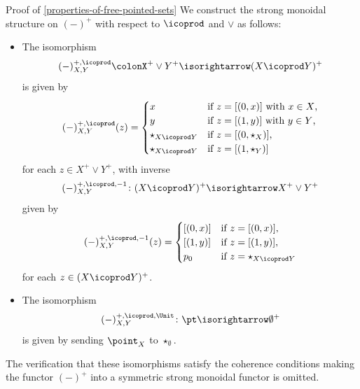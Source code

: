 \begin{Proof}{Proof of \cref{properties-of-free-pointed-sets}}
    We construct the strong monoidal structure on $(-)^{+}$ with respect to $\icoprod$ and $\vee$ as follows:
    \begin{itemize}
        \item{}The isomorphism
            \[
                (-)^{+,\icoprod}_{X,Y}%
                \colon%
                X^{+}\vee Y^{+}%
                \isorightarrow
                (X\icoprod Y)^{+}
            \]%
            is given by
            \[
                (-)^{+,\icoprod}_{X,Y}(z)%
                =%
                \begin{cases}%
                    x                   &\text{if $z=[(0,x)]$ with $x\in X$,}\\%
                    y                   &\text{if $z=[(1,y)]$ with $y\in Y$,}\\%
                    \star_{X\icoprod Y} &\text{if $z=[(0,\star_{X})]$,}\\%
                    \star_{X\icoprod Y} &\text{if $z=[(1,\star_{Y})]$}%
                \end{cases}%
            \]%
            for each $z\in X^{+}\vee Y^{+}$, with inverse
            \[
                (-)^{+,\icoprod,-1}_{X,Y}
                \colon%
                (X\icoprod Y)^{+}
                \isorightarrow
                X^{+}\vee Y^{+}%
            \]%
            given by
            \[
                (-)^{+,\icoprod,-1}_{X,Y}(z)%
                =%
                \begin{cases}
                    [(0,x)] &\text{if $z=[(0,x)]$,}\\
                    [(1,y)] &\text{if $z=[(1,y)]$,}\\
                    p_{0}   &\text{if $z=\star_{X\icoprod Y}$}
                \end{cases}
            \]%
            for each $z\in(X\icoprod Y)^{+}$.
        \item{}The isomorphism
            \[
                (-)^{+,\icoprod,\Unit}_{X,Y}%
                \colon%
                \pt%
                \isorightarrow
                \emptyset^{+}%
            \]%
            is given by sending $\point_{X}$ to $\star_{\emptyset}$.
    \end{itemize}
    The verification that these isomorphisms satisfy the coherence conditions making the functor $(-)^{+}$ into a symmetric strong monoidal functor is omitted.


\end{Proof}
